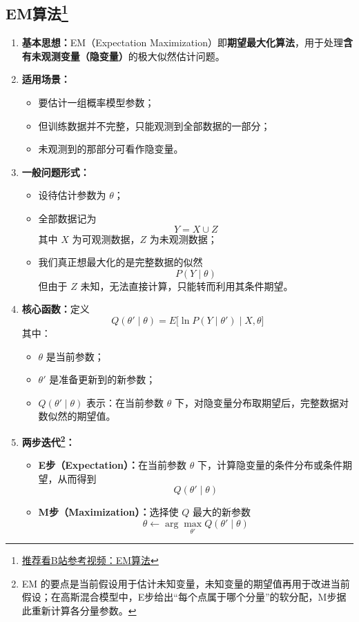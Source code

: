 \documentclass[../main.tex]{subfiles}
\begin{document}
\subsection{EM算法\texorpdfstring{\protect\footnote{\href{https://www.bilibili.com/video/BV1RT411G7jJ?spm_id_from=333.788.videopod.sections&vd_source=5deca47094767260f853b759a625a68f}{推荐看B站参考视频：EM算法}}}{}}\label{sec:em-algorithm}
\begin{enumerate}
    \item \textbf{基本思想：}EM（Expectation Maximization）即\textbf{期望最大化算法}，用于处理\textbf{含有未观测变量（隐变量）}的极大似然估计问题。

    \item \textbf{适用场景：}
    \begin{itemize}
        \item 要估计一组概率模型参数；
        \item 但训练数据并不完整，只能观测到全部数据的一部分；
        \item 未观测到的那部分可看作隐变量。
    \end{itemize}

    \item \textbf{一般问题形式：}
    \begin{itemize}
        \item 设待估计参数为 $\theta$；
        \item 全部数据记为
        $$
        Y=X\cup Z
        $$
        其中 $X$ 为可观测数据，$Z$ 为未观测数据；
        \item 我们真正想最大化的是完整数据的似然
        $$
        P(Y\mid \theta)
        $$
        但由于 $Z$ 未知，无法直接计算，只能转而利用其条件期望。
    \end{itemize}

    \item \textbf{核心函数：}定义
    $$
    Q(\theta'\mid \theta)=E\bigl[\ln P(Y\mid \theta')\mid X,\theta\bigr]
    $$
    其中：
    \begin{itemize}
        \item $\theta$ 是当前参数；
        \item $\theta'$ 是准备更新到的新参数；
        \item $Q(\theta'\mid \theta)$ 表示：在当前参数 $\theta$ 下，对隐变量分布取期望后，完整数据对数似然的期望值。
    \end{itemize}

    \item \textbf{两步迭代\footnote{EM 的要点是当前假设用于估计未知变量，未知变量的期望值再用于改进当前假设；在高斯混合模型中，E步给出“每个点属于哪个分量”的软分配，M步据此重新计算各分量参数。}：}
    \begin{itemize}
        \item \textbf{E步（Expectation）：}在当前参数 $\theta$ 下，计算隐变量的条件分布或条件期望，从而得到
        $$
        Q(\theta'\mid \theta)
        $$
        \item \textbf{M步（Maximization）：}选择使 $Q$ 最大的新参数
        $$
        \theta\leftarrow \arg\max_{\theta'}Q(\theta'\mid \theta)
        $$
    \end{itemize}


\end{enumerate}
\end{document}
